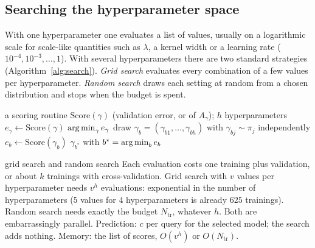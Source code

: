 \documentclass[11pt]{article}
\begin{document}
\subsection{Searching the hyperparameter space}\label{sec:search}

With one hyperparameter one evaluates a list of values, usually on a logarithmic scale for scale-like quantities such
as $\lambda$, a kernel width or a learning rate ($10^{-4}, 10^{-3}, \dots, 1$). With several hyperparameters there are
two standard strategies (Algorithm~\ref{alg:search}). \emph{Grid search} evaluates every combination of a few values
per hyperparameter. \emph{Random search} draws each setting at random from a chosen distribution and stops when the
budget is spent.

\begin{algorithm}[H]\small
\caption{Grid search and random search}
\label{alg:search}
\begin{algorithmic}[1]
\Require a scoring routine $\mathrm{Score}(\gamma)$ (validation error, or  of $A_\gamma$); $h$ hyperparameters
   \State $e_\gamma \gets \mathrm{Score}(\gamma)$ \EndFor
  \State \Return $\operatorname*{arg\,min}_\gamma e_\gamma$ 
\EndFunction
{}
    \State draw $\gamma_b = (\gamma_{b1}, \dots, \gamma_{bh})$ with $\gamma_{bj} \sim \pi_j$ independently
    \Statex {}
    \State $e_b \gets \mathrm{Score}(\gamma_b)$
  \EndFor
  \State \Return $\gamma_{b^*}$ with $b^* = \operatorname*{arg\,min}_b e_b$ 
\EndFunction
\end{algorithmic}
\end{algorithm}

\begin{runtime}{grid search and random search}
Each evaluation costs one training plus validation, or about $k$ trainings with cross-validation. Grid search with $v$
values per hyperparameter needs $v^h$ evaluations: exponential in the number of hyperparameters ($5$ values for $4$
hyperparameters is already $625$ trainings). Random search needs exactly the budget $N_{\mathrm{tr}}$, whatever $h$. Both are
embarrassingly parallel. Prediction: $c$ per query for the selected model; the search adds nothing. Memory: the
list of scores, $O(v^h)$ or $O(N_{\mathrm{tr}})$.
\end{runtime}
\end{document}
